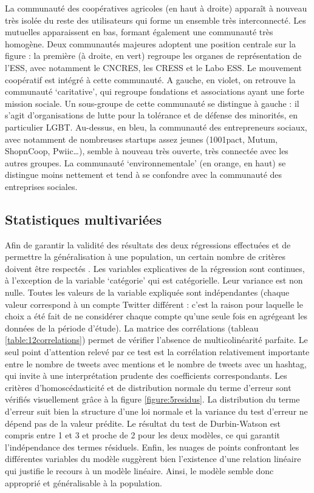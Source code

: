         La communauté des coopératives agricoles (en haut à droite) apparaît à nouveau très isolée du reste des utilisateurs qui forme un ensemble très interconnecté. Les mutuelles apparaissent en bas, formant également une communauté très homogène. Deux communautés majeures adoptent une position centrale sur la figure : la première (à droite, en vert) regroupe les organes de représentation de l’ESS, avec notamment le CNCRES, les CRESS et le Labo ESS. Le mouvement coopératif est intégré à cette communauté. A gauche, en violet, on retrouve la communauté ‘caritative’, qui regroupe fondations et associations ayant une forte mission sociale. Un sous-groupe de cette communauté se distingue à gauche : il s’agit d’organisations de lutte pour la tolérance et de défense des minorités, en particulier LGBT. Au-dessus, en bleu, la communauté des entrepreneurs sociaux, avec notamment de nombreuses startups assez jeunes (1001pact, Mutum, ShopnCoop, Pwiic…), semble à nouveau très ouverte, très connectée avec les autres groupes. La communauté ‘environnementale’ (en orange, en haut) se distingue moins nettement et tend à se confondre avec la communauté des entreprises sociales.

    \subsection{Statistiques multivariées}
        Afin de garantir la validité des résultats des deux régressions effectuées et de permettre la généralisation à une population, un certain nombre de critères doivent être respectés \parencite{field2009discovering}.
        Les variables explicatives de la régression sont continues, à l’exception de la variable ‘catégorie’ qui est catégorielle. Leur variance est non nulle. Toutes les valeurs de la variable expliquée sont indépendantes (chaque valeur correspond à un compte Twitter différent : c’est la raison pour laquelle le choix a été fait de ne considérer chaque compte qu’une seule fois en agrégeant les données de la période d’étude). La matrice des corrélations (tableau \ref{table:12correlations}) permet de vérifier l’absence de multicolinéarité parfaite. Le seul point d’attention relevé par ce test est la corrélation relativement importante entre le nombre de tweets avec mentions et le nombre de tweets avec un hashtag, qui invite à une interprétation prudente des coefficients correspondants. Les critères d’homoscédasticité et de distribution normale du terme d’erreur sont vérifiés visuellement grâce à la figure \ref{figure:5residus}. La distribution du terme d’erreur suit bien la structure d’une loi normale et la variance du test d’erreur ne dépend pas de la valeur prédite. Le résultat du test de Durbin-Watson est compris entre 1 et 3 et proche de 2 pour les deux modèles, ce qui garantit l’indépendance des termes résiduels. Enfin, les nuages de points confrontant les différentes variables du modèle suggèrent bien l’existence d’une relation linéaire qui justifie le recours à un modèle linéaire. Ainsi, le modèle semble donc approprié et généralisable à la population.

